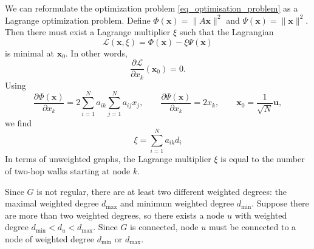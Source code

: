 \documentclass{comnet}%
\newcommand{\pd}[2]{\dfrac{\partial #1}{\partial #2}}
\newcommand{\x}{\mathbf{x}}
\renewcommand{\u}{\mathbf{u}}
\begin{document}
We can reformulate the optimization problem \eqref{eq_optimisation_problem} as a Lagrange optimization problem. Define $\Phi(\x) = \| A \x\|^2$ and $\Psi(\x)=\|\x\|^2$. Then there must exist a Lagrange multiplier $\xi$ such that the Lagrangian
\begin{equation*}
	\mathcal{L}(\x, \xi) = \Phi(\x) - \xi \Psi(\x)
\end{equation*}
is minimal at $\x_0$. In other words,
\begin{equation*}
	\pd{\mathcal{L}}{x_k}(\x_0) = 0.
\end{equation*}
Using
\begin{equation*}
	\pd{\Phi(\x)}{x_k} = 2 \sum_{i=1}^N a_{ik} \sum_{j=1}^N a_{ij} x_j, \qquad \pd{\Psi(\x)}{x_k} = 2 x_k, \qquad \x_0 = \frac{1}{\sqrt{N}} \u,
\end{equation*}
we find
\begin{equation*}
	\xi = \sum_{i=1}^N a_{ik} d_i
\end{equation*}
In terms of unweighted graphs, the Lagrange multiplier $\xi$ is equal to the number of two-hop walks starting at node $k$.

Since $G$ is not regular, there are at least two different weighted degrees: the maximal weighted degree $d_{\max}$ and minimum weighted degree $d_{\min}$. Suppose there are more than two weighted degrees, so there exists a node $u$ with weighted degree $d_{\min} < d_u < d_{\max}$. Since $G$ is connected, node $u$ must be connected to a node of weighted degree $d_{\min}$ or $d_{\max}$.
\end{document}

